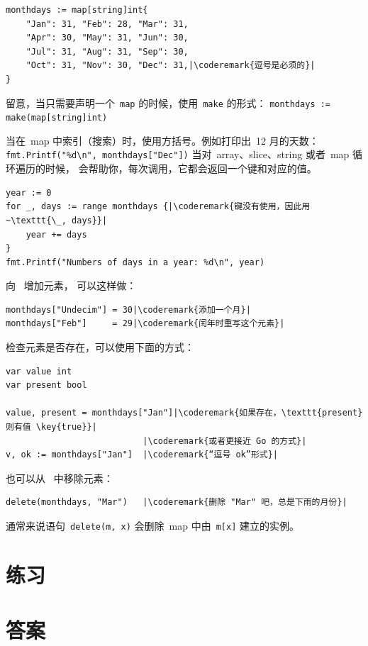 \begin{lstlisting}
monthdays := map[string]int{
	"Jan": 31, "Feb": 28, "Mar": 31, 
	"Apr": 30, "May": 31, "Jun": 30, 
	"Jul": 31, "Aug": 31, "Sep": 30, 
	"Oct": 31, "Nov": 30, "Dec": 31,|\coderemark{逗号是必须的}|
}
\end{lstlisting}
留意，当只需要声明一个~\lstinline{map} 的时候，使用~\lstinline{make} 的形式：
\lstinline|monthdays := make(map[string]int)|

当在~map 中索引（搜索）时，使用方括号。例如打印出~12 月的天数：
\lstinline{fmt.Printf("%d\n", monthdays["Dec"])}\newline
当对~array、slice、string 或者~map 循环遍历的时候，
会帮助你，每次调用，它都会返回一个键和对应的值。
\begin{lstlisting}
year := 0
for _, days := range monthdays {|\coderemark{键没有使用，因此用~\texttt{\_, days}}|
    year += days
}
fmt.Printf("Numbers of days in a year: %d\n", year)
\end{lstlisting}
向~ 增加元素， 可以这样做：
\begin{lstlisting}
monthdays["Undecim"] = 30|\coderemark{添加一个月}|
monthdays["Feb"]     = 29|\coderemark{闰年时重写这个元素}|
\end{lstlisting}
检查元素是否存在，可以使用下面的方式\cite{go_course_day2}：
\begin{lstlisting}
var value int
var present bool

value, present = monthdays["Jan"]|\coderemark{如果存在，\texttt{present} 则有值 \key{true}}|
                           |\coderemark{或者更接近 Go 的方式}|
v, ok := monthdays["Jan"]  |\coderemark{“逗号 ok”形式}|
\end{lstlisting}
也可以从~ 中移除元素：
\begin{lstlisting}
delete(monthdays, "Mar")   |\coderemark{删除 "Mar" 吧，总是下雨的月份}|
\end{lstlisting}
通常来说语句~\lstinline{delete(m, x)} 会删除~map 中由~\lstinline{m[x]} 建立的实例。

\section{练习}








\cleardoublepage
\section{答案}
\shipoutAnswer
